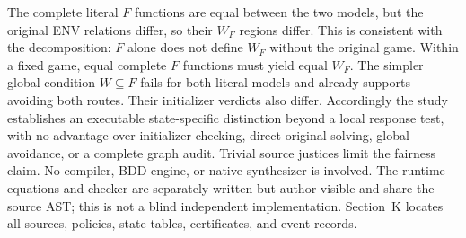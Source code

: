 The complete literal $F$ functions are equal between the two models,
but the original ENV relations differ, so their $W_F$ regions differ.
This is consistent with the decomposition: $F$ alone does not define
$W_F$ without the original game. Within a fixed game, equal complete
$F$ functions must yield equal $W_F$. The simpler global condition
$W\subseteq F$ fails for both literal models and already supports
avoiding both routes. Their initializer verdicts also differ.
Accordingly the study establishes an executable state-specific
distinction beyond a local response test, with no advantage over
initializer checking, direct original solving, global avoidance,
or a complete graph audit. Trivial source justices limit the fairness
claim. No compiler, BDD engine, or native synthesizer is involved.
The runtime equations and checker are separately written but
author-visible and share the source AST; this is not a blind independent
implementation. Section~K locates all sources, policies, state tables,
certificates, and event records.
